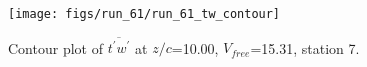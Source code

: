 \begin{figure}[H]
\centering
\texttt{[image: figs/run\_61/run\_61\_tw\_contour]}
\caption{Contour plot of $\overline{t^\prime w^\prime}$ at $z/c$=10.00, $V_{free}$=15.31, station 7.}
\label{fig:run_61_tw_contour}
\end{figure}


